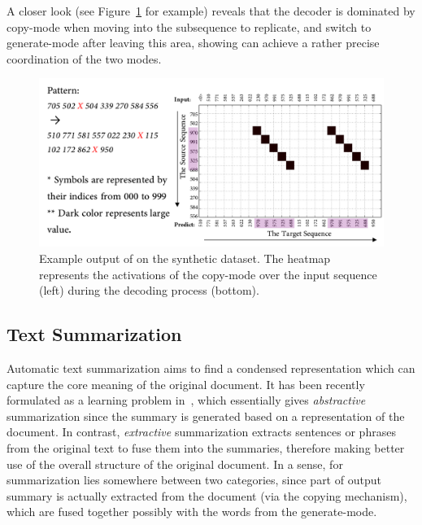 A closer look (see Figure~\ref{cp3.fig.syn} for example) reveals that the decoder is dominated by copy-mode when moving into the subsequence to replicate, and switch to generate-mode after leaving this area, showing \copynet can achieve a rather precise coordination of the two modes. \vspace{-5pt}    
\begin{figure}[hptb]
   	\centering
          	\includegraphics[width=.98\linewidth]{figs/copynet/syn2.pdf} 
          	\caption{\label{cp3.fig.syn} Example output of \copynet on the synthetic dataset. The heatmap represents the activations of the copy-mode over the input sequence (left) during the decoding process (bottom).} 
  \end{figure}   

\subsection{Text Summarization}
Automatic text summarization aims to find a condensed representation which can capture the core meaning of the original document. It has been recently formulated as a \sts learning problem in~\cite{rush2015neural,hu2015lcsts}, which essentially gives \emph{abstractive} summarization since the summary is generated based on a representation of the document. In contrast, \textit{extractive} summarization extracts sentences or phrases from the original text to fuse them into the summaries, therefore making better use of the overall structure of the original document. In a sense, \copynet for summarization lies somewhere between two categories, since part of output summary is actually extracted from the document (via the copying mechanism), which are fused together possibly with the words from the generate-mode.


